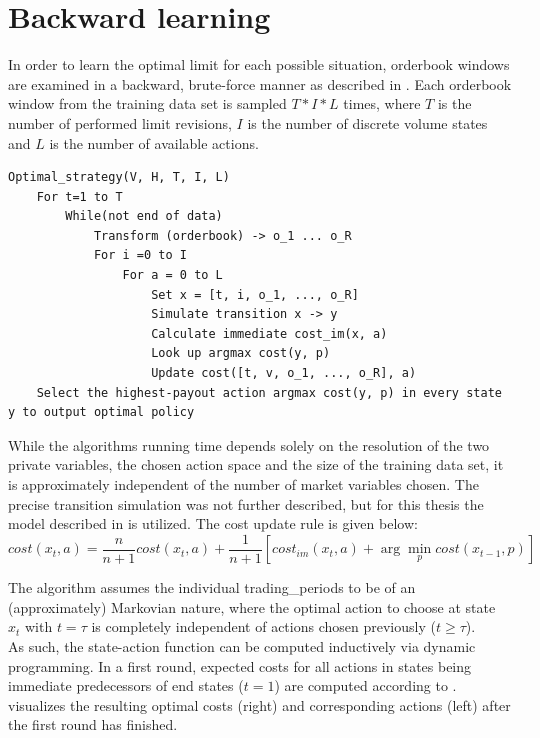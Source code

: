 \section{Backward learning}
\label{chap:backwardlearning}
In order to learn the optimal limit for each possible situation, orderbook windows are examined in a backward, brute-force manner as described in . Each orderbook window from the training data set is sampled $T*I*L$ times, where $T$ is the number of performed limit revisions, $I$ is the number of discrete volume states and $L$ is the number of available actions.

\begin{lstlisting}[frame=single, breaklines=true, basicstyle=\scriptsize, caption=Brute-Force strategy learning approach as described in \Cite{Nevmyvaka:2006}., label=lst:bruteforce:pseudocode]
Optimal_strategy(V, H, T, I, L)
    For t=1 to T
        While(not end of data)
            Transform (orderbook) -> o_1 ... o_R
            For i =0 to I
                For a = 0 to L
                    Set x = [t, i, o_1, ..., o_R]
                    Simulate transition x -> y
                    Calculate immediate cost_im(x, a)
                    Look up argmax cost(y, p)
                    Update cost([t, v, o_1, ..., o_R], a)
    Select the highest-payout action argmax cost(y, p) in every state y to output optimal policy
\end{lstlisting}

While the algorithms running time depends solely on the resolution of the two private variables, the chosen action space and the size of the training data set, it is approximately independent of the number of market variables chosen. The precise transition simulation was not further described, but for this thesis the model described in  is utilized. The cost update rule is given below: 
\begin{equation}\label{eq:costfunction}
   cost(x_t, a) = \dfrac{n}{n+1} cost(x_t, a) + \dfrac{1}{n+1} [cost_{im}(x_t,a) + \arg\min_{p}cost(x_{t-1}, p)]
\end{equation}

The algorithm assumes the individual trading\_periods to be of an (approximately) Markovian nature, where the optimal action to choose at state $x_t$ with $t = \tau$ is completely independent of actions chosen previously ($t \geq \tau$).\\

As such, the state-action function can be computed inductively via dynamic programming. In a first round, expected costs for all actions in states being immediate predecessors of end states (\ie $t=1$) are computed according to .  visualizes the resulting optimal costs (right) and corresponding actions (left) after the first round has finished.


